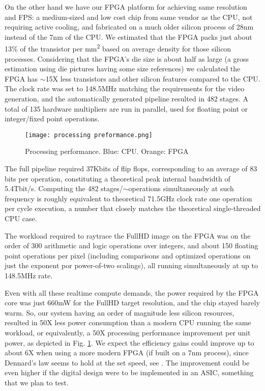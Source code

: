 \documentclass[conference]{IEEEtran}
\begin{document}
On the other hand we have our FPGA platform for achieving same resolution and FPS: a medium-sized and low cost chip from same vendor as the CPU, not requiring active cooling, and fabricated on a much older silicon process of 28nm instead of the 7nm of the CPU. We estimated that the FPGA packs just about 13\% of the transistor per mm\textsuperscript{2} based on average density for those silicon processes\cite{dennard}. Considering that the FPGA’s die size is about half as large (a gross estimation using die pictures having some size references) we calculated the FPGA has $\sim$15X less transistors and other silicon features compared to the CPU. The clock rate was set to 148.5MHz matching the requirements for the video generation, and the automatically generated pipeline resulted in 482 stages. A total of 135 hardware multipliers are run in parallel, used for floating point or integer/fixed point operations.

\begin{figure}
\texttt{[image: processing preformance.png]}
\caption{Processing performance. Blue: CPU. Orange: FPGA}
\label{figperf}
\end{figure}

The full pipeline required 37Kbits of flip flops, corresponding to an average of 83 bits per operation, constituting a theoretical peak internal bandwidth of 5.4Tbit/s. Computing the 482 stages/$\sim$operations simultaneously at such frequency is roughly equivalent to theoretical 71.5GHz clock rate one operation per cycle execution, a number that closely matches the theoretical single-threaded CPU case.

The workload required to raytrace the FullHD image on the FPGA was on the order of 300 arithmetic and logic operations over integers, and about 150 floating point operations per pixel (including comparisons and optimized operations on just the exponent por power-of-two scalings), all running simultaneously at up to 148.5MHz rate.

Even with all these realtime compute demands, the power required by the FPGA core was just 660mW for the FullHD target resolution, and the chip stayed barely warm. So, our system having an order of magnitude less silicon resources, resulted in 50X less power consumption than a modern CPU running the same workload, or equivalently, a 50X processing performance improvement per unit power, as depicted in Fig. \ref{figperf}. We expect the efficiency gains could improve up to about 6X when using a more modern FPGA (if built on a 7nm process), since Dennard's law seems to hold at the set speed, see \cite{dennard}. The improvement could be even higher if the digital design were to be implemented in an ASIC, something that we plan to test.
\\
\end{document}
